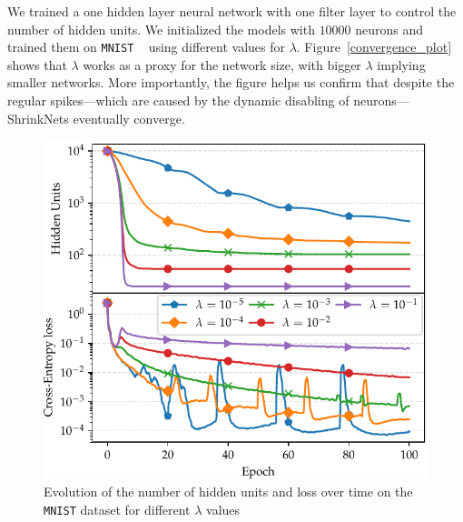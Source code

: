 \documentclass[sigconf]{acmart}
\newcommand{\gl}[1]{\textcolor{violet}{{\bf Gl:} #1}}
\begin{document}
We trained a one hidden layer
neural network with one filter layer to control the number of hidden units. We
initialized the models with $10000$ neurons and trained them on \texttt{MNIST}
~\cite{Lecun1998} using different values for $\lambda$.
Figure~\autoref{convergence_plot} shows that
$\lambda$ works as a proxy for the network size,
with bigger $\lambda$ implying smaller
networks. More importantly, the figure helps us confirm that despite the regular
spikes---which are caused by the dynamic disabling of neurons---ShrinkNets
eventually converge.

\begin{figure}
\vspace{-.2in}
\begin{center}
\includegraphics[width=\columnwidth]{convergence}
\vspace{-.25in}
\caption{Evolution of the number of hidden units and loss over time on the \texttt{MNIST} dataset for different $\lambda$ values \label{convergence_plot}}
\vspace{-.2in}
\end{center}
\end{figure}
\end{document}
